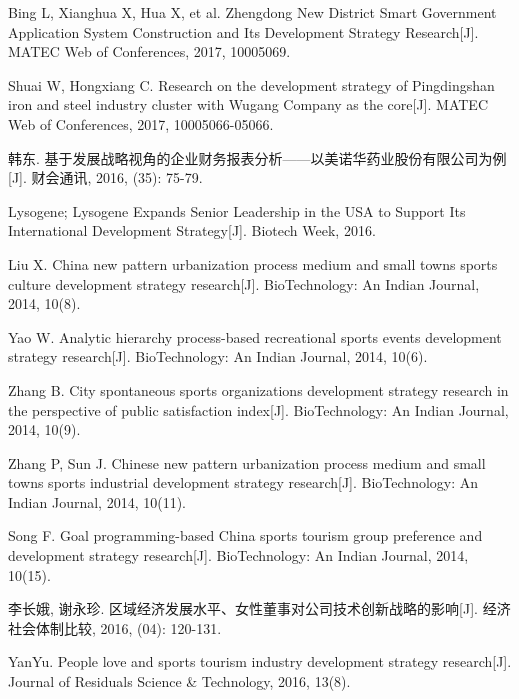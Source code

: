 \documentclass[UTF8, a4paper, 11pt]{ctexart}
\begin{document}
\begin{UnifiedBox}[height=25.4cm]
\begin{enumerate}[label={[}\arabic*{]}, leftmargin=2em, itemsep=0.15em, parsep=0pt]
\item Bing L, Xianghua X, Hua X, et al. Zhengdong New District Smart Government Application System Construction and Its Development Strategy Research[J]. MATEC Web of Conferences, 2017, 10005069.

\item Shuai W, Hongxiang C. Research on the development strategy of Pingdingshan iron and steel industry cluster with Wugang Company as the core[J]. MATEC Web of Conferences, 2017, 10005066-05066.

\item 韩东. 基于发展战略视角的企业财务报表分析——以美诺华药业股份有限公司为例[J]. 财会通讯, 2016, (35): 75-79.

\item Lysogene; Lysogene Expands Senior Leadership in the USA to Support Its International Development Strategy[J]. Biotech Week, 2016.

\item Liu X. China new pattern urbanization process medium and small towns sports culture development strategy research[J]. BioTechnology: An Indian Journal, 2014, 10(8).

\item Yao W. Analytic hierarchy process-based recreational sports events development strategy research[J]. BioTechnology: An Indian Journal, 2014, 10(6).

\item Zhang B. City spontaneous sports organizations development strategy research in the perspective of public satisfaction index[J]. BioTechnology: An Indian Journal, 2014, 10(9).

\item Zhang P, Sun J. Chinese new pattern urbanization process medium and small towns sports industrial development strategy research[J]. BioTechnology: An Indian Journal, 2014, 10(11).

\item Song F. Goal programming-based China sports tourism group preference and development strategy research[J]. BioTechnology: An Indian Journal, 2014, 10(15).

\item 李长娥, 谢永珍. 区域经济发展水平、女性董事对公司技术创新战略的影响[J]. 经济社会体制比较, 2016, (04): 120-131.

\item YanYu. People love and sports tourism industry development strategy research[J]. Journal of Residuals Science \& Technology, 2016, 13(8).


\end{enumerate}
\end{UnifiedBox}
\end{document}
